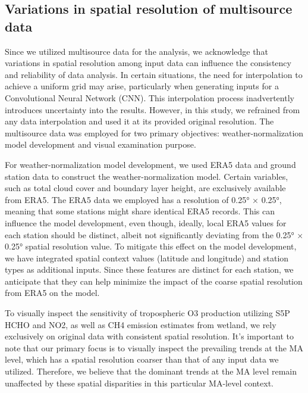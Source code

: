 \subsection{Variations in spatial resolution of multisource data}
Since we utilized multisource data for the analysis, we acknowledge that variations in spatial resolution among input data can influence the consistency and reliability of data analysis. In certain situations, the need for interpolation to achieve a uniform grid may arise, particularly when generating inputs for a Convolutional Neural Network (CNN). This interpolation process inadvertently introduces uncertainty into the results.  However, in this study, we refrained from any data interpolation and used it at its provided original resolution. The multisource data was employed for two primary objectives: weather-normalization model development and visual examination purpose. \par
For weather-normalization model development, we used ERA5 data and ground station data to construct the weather-normalization model. Certain variables, such as total cloud cover and boundary layer height, are exclusively available from ERA5. The ERA5 data we employed has a resolution of 0.25° × 0.25°, meaning that some stations might share identical ERA5 records. This can influence the model development, even though, ideally, local ERA5 values for each station should be distinct, albeit not significantly deviating from the 0.25° × 0.25° spatial resolution value. To mitigate this effect on the model development, we have integrated spatial context values (latitude and longitude) and station types as additional inputs. Since these features are distinct for each station, we anticipate that they can help minimize the impact of the coarse spatial resolution from ERA5 on the model. \par
To visually inspect the sensitivity of tropospheric O3 production utilizing S5P HCHO and NO2, as well as CH4 emission estimates from wetland, we rely exclusively on original data with consistent spatial resolution. It's important to note that our primary focus is to visually inspect the prevailing trends at the MA level, which has a spatial resolution coarser than that of any input data we utilized. Therefore, we believe that the dominant trends at the MA level remain unaffected by these spatial disparities in this particular MA-level context. \par

